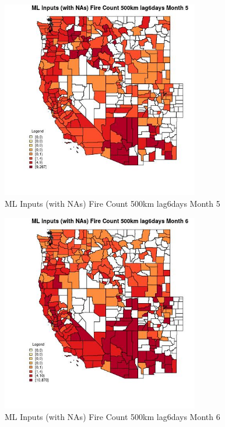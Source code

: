 \begin{figure} 
\centering  
\includegraphics[width=0.77\textwidth]{Code_Outputs/Report_ML_input_PM25_Step4_part_e_de_duplicated_aves_compiled_2019-05-21wNAs_CountyFire_Count_500km_lag6daysmedianMonth5.jpg} 
\caption{\label{fig:Report_ML_input_PM25_Step4_part_e_de_duplicated_aves_compiled_2019-05-21wNAsCountyFire_Count_500km_lag6daysmedianMonth5}ML Inputs (with NAs) Fire Count 500km lag6days Month 5} 
\end{figure} 
 

\begin{figure} 
\centering  
\includegraphics[width=0.77\textwidth]{Code_Outputs/Report_ML_input_PM25_Step4_part_e_de_duplicated_aves_compiled_2019-05-21wNAs_CountyFire_Count_500km_lag6daysmedianMonth6.jpg} 
\caption{\label{fig:Report_ML_input_PM25_Step4_part_e_de_duplicated_aves_compiled_2019-05-21wNAsCountyFire_Count_500km_lag6daysmedianMonth6}ML Inputs (with NAs) Fire Count 500km lag6days Month 6} 
\end{figure} 
 

